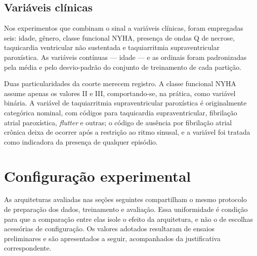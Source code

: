 \subsection{Variáveis clínicas}
\label{subsec:met-clinicas}

Nos experimentos que combinam o sinal a variáveis clínicas, foram empregadas
seis: idade, gênero, classe funcional NYHA, presença de ondas Q de necrose,
taquicardia ventricular não sustentada e taquiarritmia supraventricular
paroxística. As variáveis contínuas --- idade --- e as ordinais foram
padronizadas pela média e pelo desvio-padrão do conjunto de treinamento de
cada partição.

Duas particularidades da coorte merecem registro. A classe funcional NYHA
assume apenas os valores II e III, comportando-se, na prática, como variável
binária. A variável de taquiarritmia supraventricular paroxística é
originalmente categórica nominal, com códigos para taquicardia
supraventricular, fibrilação atrial paroxística, \textit{flutter} e outras;
o código de ausência por fibrilação atrial crônica deixa de ocorrer após a
restrição ao ritmo sinusal, e a variável foi tratada como indicadora da
presença de qualquer episódio.



%
%
%

\section{Configuração experimental}
\label{sec:configuracao-experimental}

As arquiteturas avaliadas nas seções seguintes compartilham o mesmo
protocolo de preparação dos dados, treinamento e avaliação. Essa
uniformidade é condição para que a comparação entre elas isole o efeito da
arquitetura, e não o de escolhas acessórias de configuração. Os valores
adotados resultaram de ensaios preliminares e são apresentados a seguir,
acompanhados da justificativa correspondente.

